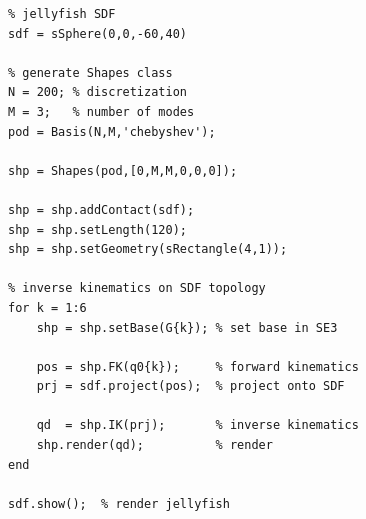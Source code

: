 \begin{lstlisting}[style=matlab] 
%% EXAMPLE: Shapes class 
% jellyfish SDF
sdf = sSphere(0,0,-60,40) 

% generate Shapes class 
N = 200; % discretization
M = 3;   % number of modes
pod = Basis(N,M,'chebyshev');     

shp = Shapes(pod,[0,M,M,0,0,0]);

shp = shp.addContact(sdf);
shp = shp.setLength(120);
shp = shp.setGeometry(sRectangle(4,1));

% inverse kinematics on SDF topology
for k = 1:6
    shp = shp.setBase(G{k}); % set base in SE3

    pos = shp.FK(q0{k});     % forward kinematics
    prj = sdf.project(pos);  % project onto SDF

    qd  = shp.IK(prj);       % inverse kinematics
    shp.render(qd);          % render
end

sdf.show();  % render jellyfish
\end{lstlisting}